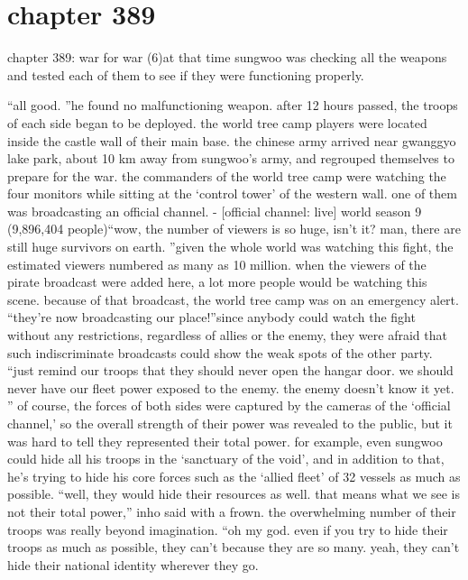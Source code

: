 \section{chapter 389}

chapter 389: war for war (6)at that time sungwoo was checking all the weapons and tested each of them to see if they were functioning properly.





“all good.
”he found no malfunctioning weapon.
after 12 hours passed, the troops of each side began to be deployed.
 the world tree camp players were located inside the castle wall of their main base.
the chinese army arrived near gwanggyo lake park, about 10 km away from sungwoo’s army, and regrouped themselves to prepare for the war.
the commanders of the world tree camp were watching the four monitors while sitting at the ‘control tower’ of the western wall.
 one of them was broadcasting an official channel.
- [official channel: live] world season 9 (9,896,404 people)“wow, the number of viewers is so huge, isn’t it? man, there are still huge survivors on earth.
”given the whole world was watching this fight, the estimated viewers numbered as many as 10 million.
 when the viewers of the pirate broadcast were added here, a lot more people would be watching this scene.
because of that broadcast, the world tree camp was on an emergency alert.
“they’re now broadcasting our place!”since anybody could watch the fight without any restrictions, regardless of allies or the enemy, they were afraid that such indiscriminate broadcasts could show the weak spots of the other party.
“just remind our troops that they should never open the hangar door.
 we should never have our fleet power exposed to the enemy.
 the enemy doesn’t know it yet.
”
of course, the forces of both sides were captured by the cameras of the ‘official channel,’ so the overall strength of their power was revealed to the public, but it was hard to tell they represented their total power.
for example, even sungwoo could hide all his troops in the ‘sanctuary of the void’, and in addition to that, he’s trying to hide his core forces such as the ‘allied fleet’ of 32 vessels as much as possible.
“well, they would hide their resources as well.
 that means what we see is not their total power,” inho said with a frown.
the overwhelming number of their troops was really beyond imagination.
“oh my god.
 even if you try to hide their troops as much as possible, they can’t because they are so many.
 yeah, they can’t hide their national identity wherever they go.
